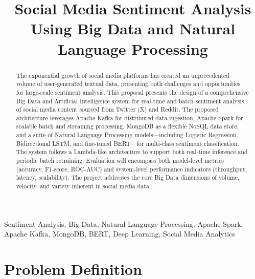\documentclass[conference]{IEEEtran}
\begin{document}
\title{Social Media Sentiment Analysis Using Big Data and Natural Language Processing}

\author{
}

\maketitle

\begin{abstract}
The exponential growth of social media platforms has created an unprecedented volume of user-generated textual data, presenting both challenges and opportunities for large-scale sentiment analysis. This proposal presents the design of a comprehensive Big Data and Artificial Intelligence system for real-time and batch sentiment analysis of social media content sourced from Twitter (X) and Reddit. The proposed architecture leverages Apache Kafka for distributed data ingestion, Apache Spark for scalable batch and streaming processing, MongoDB as a flexible NoSQL data store, and a suite of Natural Language Processing models---including Logistic Regression, Bidirectional LSTM, and fine-tuned BERT---for multi-class sentiment classification. The system follows a Lambda-like architecture to support both real-time inference and periodic batch retraining. Evaluation will encompass both model-level metrics (accuracy, F1-score, ROC-AUC) and system-level performance indicators (throughput, latency, scalability). The project addresses the core Big Data dimensions of volume, velocity, and variety inherent in social media data.
\end{abstract}

\begin{IEEEkeywords}
Sentiment Analysis, Big Data, Natural Language Processing, Apache Spark, Apache Kafka, MongoDB, BERT, Deep Learning, Social Media Analytics
\end{IEEEkeywords}

\section{Problem Definition}
\end{document}
